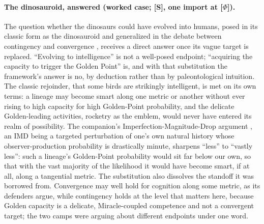 \paragraph{The dinosauroid, answered (worked case; \textbf{[S]}, one
import at \textbf{[$\Phi$]}).}\label{gc:par:dinosauroid}
The question whether the dinosaurs could have evolved into humans,
posed in its classic form as the dinosauroid \cite{RussellSeguin82}
and generalized in the debate between contingency and convergence
\cite{Gould89,ConwayMorris03}, receives a direct answer once its
vague target is replaced. ``Evolving to intelligence'' is not a
well-posed endpoint; ``acquiring the capacity to trigger the Golden
Point'' is, and with that substitution the framework's answer is no,
by deduction rather than by paleontological intuition. The classic
rejoinder, that some birds are strikingly intelligent, is met on its
own terms: a lineage may become smart along one metric or another
without ever rising to high capacity for high Golden-Point
probability, and the delicate Golden-leading activities, rocketry as
the emblem, would never have entered its realm of possibility. The
companion's Imperfection-Magnitude-Drop argument \cite{Nexus}, an
IMD being a targeted perturbation of one's own natural history whose
observer-production probability is drastically minute, sharpens
``less'' to ``vastly less'': such a lineage's Golden-Point probability would sit far
below our own, so that with the vast majority of the likelihood it
would have become smart, if at all, along a tangential metric. The
substitution also dissolves the standoff it was borrowed from.
Convergence may well hold for cognition along some metric, as its
defenders argue, while contingency holds at the level that matters
here, because Golden capacity is a delicate, Miracle-coupled
competence and not a convergent target; the two camps were arguing
about different endpoints under one word.

